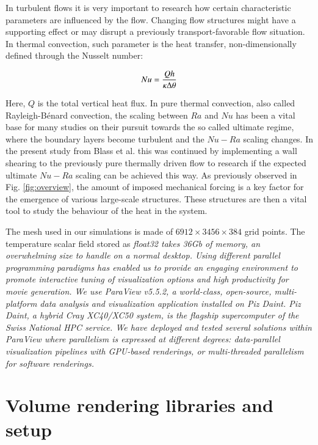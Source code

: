 \documentclass[final,5p,times,twocolumn]{elsarticle}
\begin{document}
In turbulent flows it is very important to research how certain characteristic
parameters are influenced by the flow. Changing flow structures might have a
supporting effect or may disrupt a previously transport-favorable flow situation. 
In thermal convection, such parameter is the heat transfer, non-dimensionally
defined through the Nusselt number:

\begin{equation} %
Nu= \frac{Qh}{\kappa \Delta \theta}
\label{eqn:nusselt} \\[8pt]
\end{equation} 


Here, $ Q $ is the total vertical heat flux. In pure thermal convection, also called Rayleigh-B\'enard
convection, the scaling between $ Ra $ and $ Nu $ has been a vital base for many
studies on their pursuit towards the so called ultimate regime, where the boundary
layers become turbulent and the $ Nu-Ra $ scaling changes. In the present study
from Blass et al. \cite{bla18} this was continued by implementing a wall
shearing to the previously pure thermally driven flow to research if the expected
ultimate $ Nu-Ra $ scaling can be achieved this way. As previously observed in
Fig. \ref{fig:overview}, the amount of imposed mechanical forcing is a key factor
for the emergence of various large-scale structures. These structures are then a
vital tool to study the behaviour of the heat in the system. 
\newline

The mesh used in our simulations is made of $ 6912 \times 3456 \times 384 $ grid points.
The temperature scalar field stored as \it{float32} \rm takes 36Gb of memory, an
overwhelming size to handle on a normal desktop. Using different parallel programming
paradigms has enabled us to provide an engaging environment
to promote interactive tuning of visualization options and high productivity for movie
generation. We use ParaView v5.5.2, a world-class, open-source, multi-platform data analysis and
visualization application installed on Piz Daint. Piz Daint, a hybrid Cray XC40/XC50 system,
is the flagship supercomputer of the Swiss National HPC service. We have deployed
and tested several solutions within ParaView where parallelism is expressed
at different degrees: data-parallel visualization pipelines with GPU-based renderings,
or multi-threaded parallelism for software renderings.

\section{Volume rendering libraries and setup}
\end{document}
